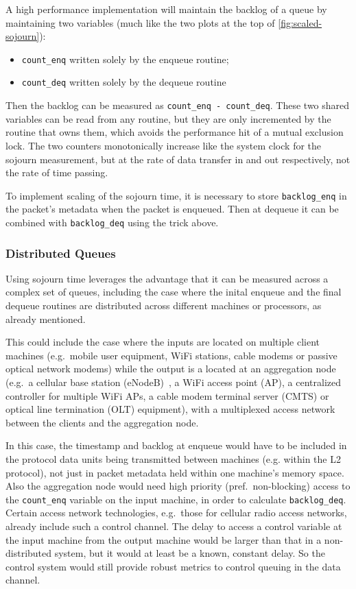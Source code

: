 A high performance implementation will maintain the backlog of a queue by maintaining two variables (much like the two plots at the top of \autoref{fig:scaled-sojourn}):
\begin{itemize}[nosep]
	\item[] \texttt{count\_enq} written solely by the enqueue routine;
	\item[] \texttt{count\_deq} written solely by the dequeue routine
\end{itemize}	
Then the backlog can be measured as \texttt{count\_enq - count\_deq}. These two shared variables can be read from any routine, but they are only incremented by the routine that owns them, which avoids the performance hit of a mutual exclusion lock. The two counters monotonically increase like the system clock for the sojourn measurement, but at the rate of data transfer in and out respectively, not the rate of time passing. 

To implement scaling of the sojourn time, it is necessary to store \texttt{backlog\_enq} in the packet's metadata when the packet is enqueued. Then at dequeue it can be combined with \texttt{backlog\_deq} using the trick above.

\subsubsection{Distributed Queues}\label{sec:sojourn-distrib}

Using sojourn time leverages the advantage that it can be measured across a complex set of queues, including the case where the inital enqueue and the final dequeue routines are distributed across different machines or processors, as already mentioned.

This could include the case where the inputs are located on multiple client machines (e.g.\ mobile user equipment, WiFi stations, cable modems or passive optical network modems) while the output is a located at an aggregation node (e.g.\ a cellular base station (eNodeB)~\cite{Tan09:AQM_uplink_patent}, a WiFi access point (AP), a centralized controller for multiple WiFi APs, a cable modem terminal server (CMTS) or optical line termination (OLT) equipment), with a multiplexed access network between the clients and the aggregation node.

In this case, the timestamp and backlog at enqueue would have to be included in the protocol data units being transmitted between machines (e.g. within the L2 protocol), not just in packet metadata held within one machine's memory space. Also the aggregation node would need high priority (pref.\ non-blocking) access to the \texttt{count\_enq} variable on the input machine, in order to calculate \texttt{backlog\_deq}. Certain access network technologies, e.g.\ those for cellular radio access networks, already include such a control channel. The delay to access a control variable at the input machine from the output machine would be larger than that in a non-distributed system, but it would at least be a known, constant delay. So the control system would still provide robust metrics to control queuing in the data channel.

